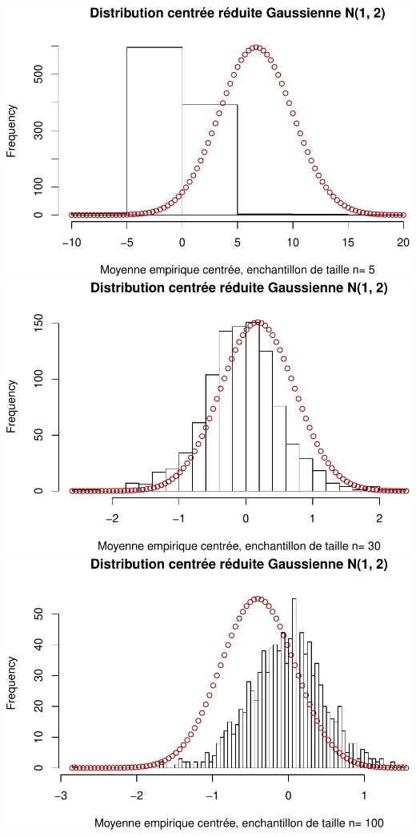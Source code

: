 \documentclass[]{article}
\begin{document}
\includegraphics{tp2_files/figure-latex/unnamed-chunk-5-1.pdf}
\includegraphics{tp2_files/figure-latex/unnamed-chunk-5-2.pdf}
\includegraphics{tp2_files/figure-latex/unnamed-chunk-5-3.pdf}
\end{document}
